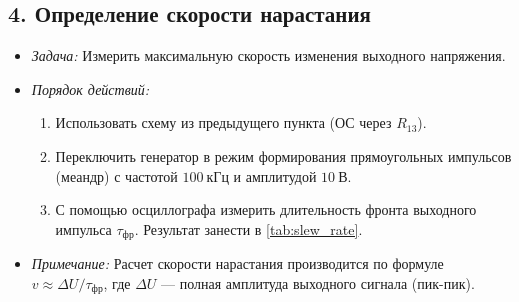 \subsection*{4. Определение скорости нарастания}
\begin{itemize}
    \item \textit{Задача:} Измерить максимальную скорость изменения выходного напряжения.
    \item \textit{Порядок действий:}
        \begin{enumerate}
            \item Использовать схему из предыдущего пункта (ОС через $R_{13}$).
            \item Переключить генератор в режим формирования прямоугольных импульсов (меандр) с частотой $100~\text{кГц}$ и амплитудой $10~\text{В}$.
            \item С помощью осциллографа измерить длительность фронта выходного импульса $\tau_{\text{фр}}$. Результат занести в \cref{tab:slew_rate}.
        \end{enumerate}
    \item \textit{Примечание:} Расчет скорости нарастания производится по формуле $v \approx \Delta U / \tau_{\text{фр}}$, где $\Delta U$ — полная амплитуда выходного сигнала (пик-пик).
\end{itemize}

